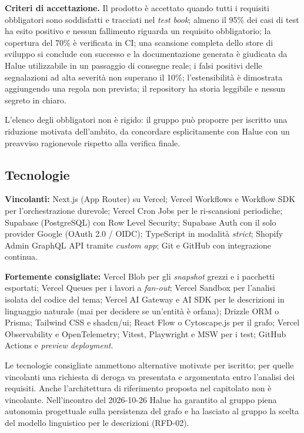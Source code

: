 \textbf{Criteri di accettazione.} Il prodotto è accettato quando tutti i requisiti obbligatori sono soddisfatti e tracciati nel \emph{test book}; almeno il 95\% dei casi di test ha esito positivo e nessun fallimento riguarda un requisito obbligatorio; la copertura del 70\% è verificata in CI; una scansione completa dello store di sviluppo si conclude con successo e la documentazione generata è giudicata da Halue utilizzabile in un passaggio di consegne reale; i falsi positivi delle segnalazioni ad alta severità non superano il 10\%; l'estensibilità è dimostrata aggiungendo una regola non prevista; il repository ha storia leggibile e nessun segreto in chiaro.

L'elenco degli obbligatori non è rigido: il gruppo può proporre per iscritto una riduzione motivata dell'ambito, da concordare esplicitamente con Halue con un preavviso ragionevole rispetto alla verifica finale.

\subsection{Tecnologie}

\textbf{Vincolanti:} Next.js (App Router) su Vercel; Vercel Workflows e Workflow SDK per l'orchestrazione durevole; Vercel Cron Jobs per le ri-scansioni periodiche; Supabase (PostgreSQL) con Row Level Security; Supabase Auth con il solo provider Google (OAuth 2.0 / OIDC); TypeScript in modalità \emph{strict}; Shopify Admin GraphQL API tramite \emph{custom app}; Git e GitHub con integrazione continua.

\textbf{Fortemente consigliate:} Vercel Blob per gli \emph{snapshot} grezzi e i pacchetti esportati; Vercel Queues per i lavori a \emph{fan-out}; Vercel Sandbox per l'analisi isolata del codice del tema; Vercel AI Gateway e AI SDK per le descrizioni in linguaggio naturale (mai per decidere se un'entità è orfana); Drizzle ORM o Prisma; Tailwind CSS e shadcn/ui; React Flow o Cytoscape.js per il grafo; Vercel Observability e OpenTelemetry; Vitest, Playwright e MSW per i test; GitHub Actions e \emph{preview deployment}.

Le tecnologie consigliate ammettono alternative motivate per iscritto; per quelle vincolanti una richiesta di deroga va presentata e argomentata entro l'analisi dei requisiti. Anche l'architettura di riferimento proposta nel capitolato non è vincolante. Nell'incontro del 2026-10-26 Halue ha garantito al gruppo piena autonomia progettuale sulla persistenza del grafo e ha lasciato al gruppo la scelta del modello linguistico per le descrizioni (RFD-02).

